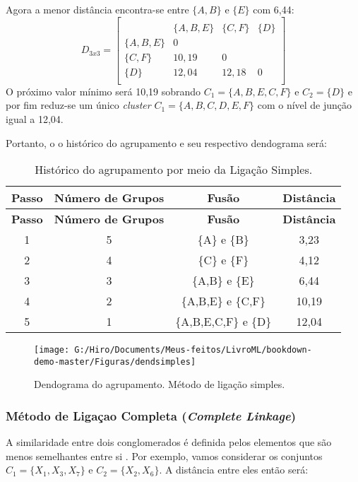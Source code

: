 \documentclass[
  openany]{book}
\begin{document}
Agora a menor distância encontra-se entre \(\{A,B\}\) e \(\{E\}\) com 6,44:
\[D_{3x3}=\begin{bmatrix}\\
 &\{A,B,E\}& \{C,F\}&\{D\} \\
 \{A,B,E\}&0&\\
 \{C,F\} & 10,19&0&\\
 \{D\}& 12,04& 12,18&0\\
\end{bmatrix}\]
O próximo valor mínimo será 10,19 sobrando \(C_1=\{A,B,E,C,F\}\) e \(C_2=\{D\}\) e por fim reduz-se um único \emph{cluster} \(C_1=\{A,B,C,D,E,F\}\) com o nível de junção igual a 12,04.

Portanto, o o histórico do agrupamento e seu respectivo dendograma será:

\begin{longtable}[]{@{}cccc@{}}
\caption{\label{tab:ligsimple} Histórico do agrupamento por meio da Ligação Simples.}\tabularnewline
\toprule
\textbf{Passo} & \textbf{Número de Grupos} & \textbf{Fusão} & \textbf{Distância}\tabularnewline
\midrule
\endfirsthead
\toprule
\textbf{Passo} & \textbf{Número de Grupos} & \textbf{Fusão} & \textbf{Distância}\tabularnewline
\midrule
\endhead
1 & 5 & \{A\} e \{B\} & 3,23\tabularnewline
2 & 4 & \{C\} e \{F\} & 4,12\tabularnewline
3 & 3 & \{A,B\} e \{E\} & 6,44\tabularnewline
4 & 2 & \{A,B,E\} e \{C,F\} & 10,19\tabularnewline
5 & 1 & \{A,B,E,C,F\} e \{D\} & 12,04\tabularnewline
\bottomrule
\end{longtable}

\begin{figure}

{\centering \texttt{[image: G:/Hiro/Documents/Meus-feitos/LivroML/bookdown-demo-master/Figuras/dendsimples]} 

}

\caption{Dendograma do agrupamento. Método de ligação simples.}\label{fig:dendsimples}
\end{figure}



\hypertarget{muxe9todo-de-ligauxe7ao-completa-complete-linkage}{%
\subsubsection{\texorpdfstring{Método de Ligaçao Completa (\emph{Complete Linkage})}{Método de Ligaçao Completa (Complete Linkage)}}\label{muxe9todo-de-ligauxe7ao-completa-complete-linkage}}

A similaridade entre dois conglomerados é definida pelos elementos que são menos semelhantes entre si \citep{sneath1957application}. Por exemplo, vamos considerar os conjuntos \(C_1=\{X_1,X_3,X_7\}\) e \(C_2=\{X_2,X_6\}\). A distância entre eles então será:
\end{document}

